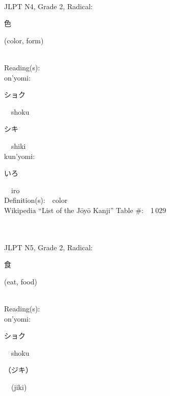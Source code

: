 \begin{multicols}{2}
{\fontsize{34pt}{40pt}  }\ \ \\  %
{JLPT N4, Grade 2, Radical:\ \ {\begin{CJK}{UTF8}{min} 色 \end{CJK}} (color, form) } \\
Reading(s):\ \ \\
{\hspace*{1em}}on'yomi:\ \ \\
{\hspace*{2em}}{\begin{CJK}{UTF8}{min} ショク \end{CJK}}\ \ shoku\ \ \\
{\hspace*{2em}}{\begin{CJK}{UTF8}{min} シキ \end{CJK}}\ \ shiki\ \ \\
{\hspace*{1em}}kun'yomi:\ \ \\
{\hspace*{2em}}{\begin{CJK}{UTF8}{min} いろ \end{CJK}}\ \ iro\ \ \\
Definition(s):\ \ color \\
Wikipedia ``List of the J\=oy\=o Kanji'' Table \#:\ \ 1\,029 \\
\ \ \\
{\fontsize{34pt}{40pt}  }\ \ \\  %
{JLPT N5, Grade 2, Radical:\ \ {\begin{CJK}{UTF8}{min} 食 \end{CJK}} (eat, food) } \\
Reading(s):\ \ \\
{\hspace*{1em}}on'yomi:\ \ \\
{\hspace*{2em}}{\begin{CJK}{UTF8}{min} ショク \end{CJK}}\ \ shoku\ \ \\
{\hspace*{2em}}{\begin{CJK}{UTF8}{min} （ジキ） \end{CJK}}\ \ (jiki)\ \ \\

\end{multicols}

